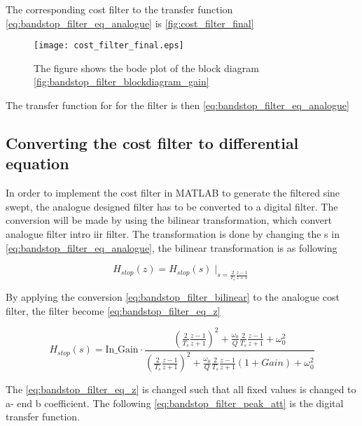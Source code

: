 The corresponding cost filter to the transfer function \autoref{eq:bandstop_filter_eq_analogue} is \autoref{fig:cost_filter_final}

\begin{figure}[H]
	\centering
	\texttt{[image: cost\_filter\_final.eps]}
	\caption{The figure shows the bode plot of the block diagram \autoref{fig:bandstop_filter_blockdiagram_gain}}
		\label{fig:cost_filter_final}
\end{figure}


The transfer function for for the filter is then \autoref{eq:bandstop_filter_eq_analogue}



\subsection{Converting the cost filter to differential equation}
In order to implement the cost filter in MATLAB to generate the filtered sine swept, the analogue designed filter has to be converted to a digital filter. The conversion will be made by using the bilinear transformation, which convert analogue filter intro \gls{iir} filter.  The transformation is done by changing the s in \autoref{eq:bandstop_filter_eq_analogue}, the bilinear transformation is as following 

\begin{equation}\label{eq:bandstop_filter_bilinear}
H_{stop}(z) = H_{stop}(s) \mid_{s=\frac{2}{T_s}\frac{z-1}{z+1}} 
\end{equation}

    \startexplain
    \stopexplain

By applying the conversion \autoref{eq:bandstop_filter_bilinear} to the analogue cost filter, the filter become \autoref{eq:bandstop_filter_eq_z}

\begin{equation}\label{eq:bandstop_filter_eq_z}
H_{stop}(s) = \text{In_Gain} \cdot \frac{(\frac{2}{T_s}\frac{z-1}{z+1})^2+\frac{\omega_0}{Q}\frac{2}{T_s}\frac{z-1}{z+1}+\omega_0^2}{(\frac{2}{T_s}\frac{z-1}{z+1})^2+\frac{\omega_0}{Q}\frac{2}{T_s}\frac{z-1}{z+1}(1+Gain)+\omega_0^2}
\end{equation}

The \autoref{eq:bandstop_filter_eq_z} is changed such that all fixed values is changed to a- end b coefficient. The following \autoref{eq:bandstop_filter_peak_att} is the digital transfer function.


